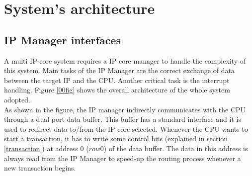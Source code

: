 \chapter{System's architecture}
\label{chap1}
\section{IP Manager interfaces}
A multi IP-core system requires a IP core manager to handle the complexity of this system.
Main tasks of the IP Manager are the correct exchange of data between the target IP and the CPU. Another critical task is the interrupt handling. Figure \ref{00fig} shows the overall architecture of the whole system adopted.\\
	
	As shown in the figure, the IP manager indirectly communicates with the CPU through a dual port data buffer. This buffer has a standard interface and it is used to redirect data to/from the IP core selected.
	Whenever the CPU wants to start a transaction, it has to write some control bits (explained in section \ref{transaction}) at address 0 ($ row0 $) of the data buffer.
	The data in this address is always read from the IP Manager to speed-up the routing process whenever a new transaction begins.\\
	

